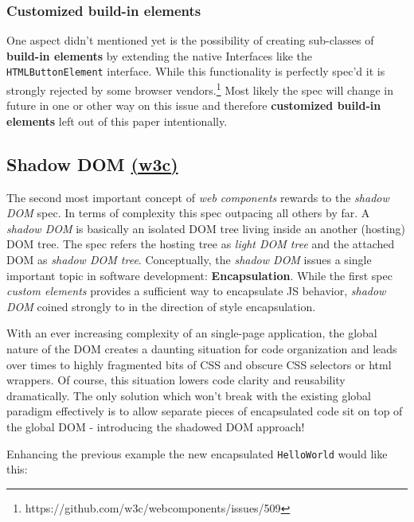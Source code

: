 \documentclass[]{assets/latex/ieee}
\begin{document}
\subsubsection{Customized build-in
elements}\label{customized-build-in-elements}

One aspect didn't mentioned yet is the possibility of creating
sub-classes of \textbf{build-in elements} by extending the native
Interfaces like the \texttt{HTMLButtonElement} interface. While this
functionality is perfectly spec'd it is strongly rejected by some
browser vendors.\footnote{https://github.com/w3c/webcomponents/issues/509}
Most likely the spec will change in future in one or other way on this
issue and therefore \textbf{customized build-in elements} left out of
this paper intentionally.

\subsection{\texorpdfstring{Shadow DOM
\href{http://w3c.github.io/webcomponents/spec/shadow/}{(w3c)}}{Shadow DOM (w3c)}}\label{shadow-dom-w3c}

The second most important concept of \emph{web components} rewards to
the \emph{shadow DOM} spec. In terms of complexity this spec outpacing
all others by far. A \emph{shadow DOM} is basically an isolated DOM tree
living inside an another (hosting) DOM tree. The spec refers the hosting
tree as \emph{light DOM tree} and the attached DOM as \emph{shadow DOM
tree}. Conceptually, the \emph{shadow DOM} issues a single important
topic in software development: \textbf{Encapsulation}. While the first
spec \emph{custom elements} provides a sufficient way to encapsulate JS
behavior, \emph{shadow DOM} coined strongly to in the direction of style
encapsulation.

With an ever increasing complexity of an single-page application, the
global nature of the DOM creates a daunting situation for code
organization and leads over times to highly fragmented bits of CSS and
obscure CSS selectors or html wrappers. Of course, this situation lowers
code clarity and reusability dramatically. The only solution which won't
break with the existing global paradigm effectively is to allow separate
pieces of encapsulated code sit on top of the global DOM - introducing
the shadowed DOM approach!

Enhancing the previous example the new encapsulated \texttt{HelloWorld}
would like this:
\end{document}
